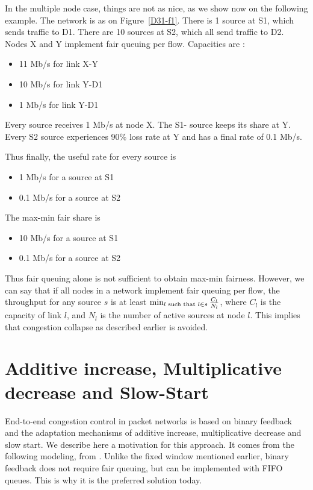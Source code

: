 In the multiple node case, things are not as nice, as we show now on
the following example. The network is as on Figure~\ref{D31-f1}.
There is 1 source at S1, which sends traffic to D1. There are 10
sources at S2, which all send traffic to D2. Nodes X and Y implement
fair queuing per flow. Capacities are :
\begin{itemize}
  \item 11 Mb/s for link X-Y
  \item 10 Mb/s for link Y-D1
  \item 1 Mb/s for link Y-D1
\end{itemize}

Every source receives 1 Mb/s at node X. The S1- source keeps its
share at Y. Every S2 source experiences 90\% loss rate at Y and
has a final rate of 0.1 Mb/s.

Thus finally, the useful rate for every source is
  \begin{itemize}
  \item 1 Mb/s for a source at S1
 \item 0.1 Mb/s for a source at S2
  \end{itemize}

The max-min fair share is
 \begin{itemize}
  \item 10 Mb/s for a source at  S1
 \item 0.1 Mb/s for a source at S2
\end{itemize}

Thus fair queuing alone is not sufficient to obtain max-min
fairness. However, we can say that if all nodes in a network
implement fair queuing per flow, the throughput for any source $s$
is at least $\min_{l \textrm{ such that } l \in s }\frac{C_l}{N_l}$, where $C_l$ is
the capacity of link $l$, and $N_l$ is the number of active sources
at node $l$. This implies that congestion collapse as described
earlier is avoided.


\section{Additive increase,
Multiplicative decrease and Slow-Start}

End-to-end congestion control in packet networks is based on binary
feedback and the adaptation mechanisms of additive increase,
multiplicative decrease and slow start. We describe here a
motivation for this approach. It comes from the following modeling,
from \cite{CJ89}. Unlike the fixed window mentioned earlier, binary
feedback does not require fair queuing, but can be implemented with
FIFO queues. This is why it is the preferred solution today.

